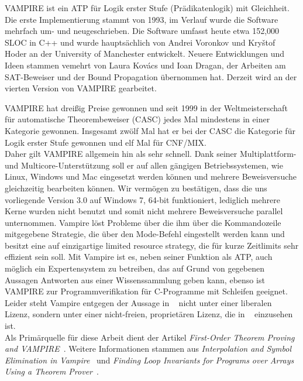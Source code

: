 \documentclass{article}
\begin{document}
VAMPIRE ist ein ATP für Logik erster Stufe (Prädikatenlogik) mit Gleichheit. Die erste Implementierung stammt von 1993, im Verlauf wurde die Software mehrfach um- und neugeschrieben.
Die Software umfasst heute etwa 152,000 SLOC in C++ und wurde hauptsächlich von Andrei Voronkov und Kry{\v{s}}tof Hoder an der University of Manchester entwickelt.
Neuere Entwicklungen und Ideen stammen vemehrt von Laura Kov{\'a}cs und Ioan Dragan, der Arbeiten am SAT-Beweiser und der Bound Propagation übernommen hat.
Derzeit wird an der vierten Version von VAMPIRE gearbeitet.

VAMPIRE hat dreißig Preise gewonnen und seit 1999 in der Weltmeisterschaft für automatische Theorembeweiser (CASC) jedes Mal mindestens in einer Kategorie gewonnen.
Insgesamt zwölf Mal hat er bei der CASC die Kategorie für Logik erster Stufe gewonnen und elf Mal für CNF/MIX. ~\cite{vampirehp} \\ Daher gilt VAMPIRE allgemein hin als sehr schnell.
Dank seiner Multiplattform- und Multicore-Unterstützung soll er auf allen gängigen Betriebssystemen, wie Linux, Windows und Mac eingesetzt werden können und mehrere Beweisversuche gleichzeitig bearbeiten können.
Wir vermögen zu bestätigen, dass die uns vorliegende Version 3.0 auf Windows 7, 64-bit funktioniert, lediglich mehrere Kerne wurden nicht benutzt und somit nicht mehrere Beweisversuche parallel unternommen.
Vampire löst Probleme über die ihm über die Kommandozeile mitgegebene Strategie, die über den Mode-Befehl eingestellt werden kann und besitzt eine auf einzigartige limited resource strategy, die für kurze Zeitlimits sehr effizient sein soll. Mit Vampire ist es, neben seiner Funktion als ATP, auch möglich ein Expertensystem zu betreiben, das auf Grund von gegebenen Aussagen Antworten aus einer Wissenssammlung geben kann, ebenso ist VAMPIRE zur Programmverifikation für C-Programme mit Schleifen geeignet. 
Leider steht Vampire entgegen der Aussage in ~\cite{cav2013} nicht unter einer liberalen Lizenz, sondern unter einer nicht-freien, proprietären Lizenz, die in ~\cite{vampirehp} einzusehen ist.
\\

Als Primärquelle für diese Arbeit dient der Artikel \textit{First-Order Theorem Proving and VAMPIRE}~\cite{cav2013}.
Weitere Informationen stammen aus \textit{Interpolation and Symbol Elimination in Vampire}~\cite{hoder2010} 
und \textit{Finding Loop Invariants for Programs over Arrays Using a Theorem Prover}~\cite{kovacs2009finding}.
\end{document}
